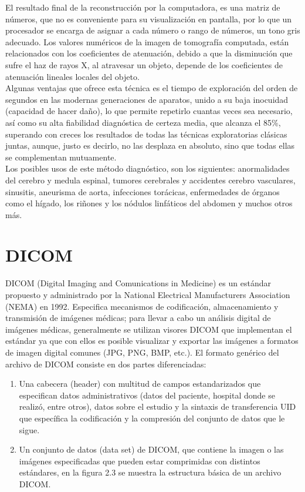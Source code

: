 \documentclass[12pt]{report}
\begin{document}
El resultado final de la reconstrucción por la computadora, es una matriz de números, que no es conveniente para su visualización en pantalla, por lo que un procesador se encarga de asignar a cada número o rango de números, un tono gris adecuado. Los valores numéricos de la imagen de tomografía computada, están relacionados con los coeficientes de atenuación, debido a que la disminución que sufre el haz de rayos X, al atravesar un objeto, depende de los coeficientes de atenuación lineales locales del objeto.\cite{tacuro}\\

Algunas ventajas que ofrece esta técnica es el tiempo de exploración del orden de segundos en las modernas generaciones de aparatos, unido a su baja inocuidad (capacidad de hacer daño), lo que permite repetirlo cuantas veces sea necesario, así como su alta fiabilidad diagnóstica de certeza media, que alcanza el 85\%, superando con creces los resultados de todas las técnicas exploratorias clásicas juntas, aunque, justo es decirlo, no las desplaza en absoluto, sino que todas ellas se complementan mutuamente.\cite{tcraneo}\\

Los posibles usos de este método diagnóstico, son los siguientes: anormalidades del cerebro y medula espinal, tumores cerebrales y accidentes cerebro vasculares, sinusitis, aneurisma de aorta, infecciones torácicas, enfermedades de órganos como el hígado, los riñones y los nódulos linfáticos del abdomen y muchos otros más.\cite{tacuro}\\

\section{DICOM}
DICOM (Digital Imaging and Comunications in Medicine) es un estándar propuesto y administrado por la National Electrical Manufacturers Association (NEMA) en 1992. Especifica mecanismos de codificación, almacenamiento y transmisión de imágenes médicas; para llevar a cabo un análisis digital de imágenes médicas, generalmente se utilizan visores DICOM que implementan el estándar ya que con ellos es posible visualizar y exportar las imágenes a formatos de imagen digital comunes (JPG, PNG, BMP, etc.). \cite{dicdie}
El formato genérico del archivo de DICOM consiste en dos partes diferenciadas:
\begin{enumerate}
\item Una cabecera (header) con multitud de campos estandarizados que especifican datos administrativos (datos del paciente, hospital donde se realizó, entre otros), datos sobre el estudio y la sintaxis de transferencia UID  que específica la codificación y la compresión del conjunto de datos que le sigue.
\item Un conjunto de datos (data set) de DICOM, que contiene la imagen o las imágenes especificadas que pueden estar comprimidas con distintos estándares, en la figura 2.3 se muestra la estructura básica de un archivo DICOM.
\end{enumerate}
\end{document}
